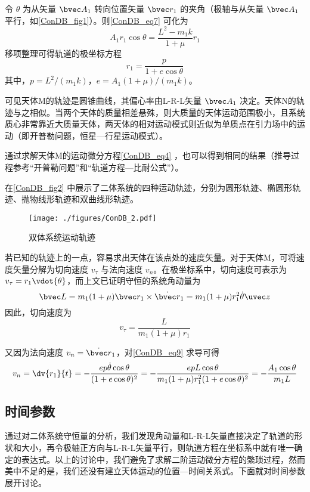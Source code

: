 令 $\theta$ 为从矢量 $\bvec A_1$ 转向位置矢量 $\bvec r_1$ 的夹角（极轴与从矢量 $\bvec A_1$ 平行，如\autoref{ConDB_fig1}）。则\autoref{ConDB_eq7} 可化为
\begin{equation}
A_1r_1\cos\theta = \frac{L^2-m_1k}{1+\mu}r_1
\end{equation}
移项整理可得轨道的极坐标方程
\begin{equation}\label{ConDB_eq9}
r_1=\frac{p}{1+e \cos\theta}
\end{equation}
其中，$p=L^2/(m_1k)$，$e=A_1(1+\mu)/(m_1k)$。

可见天体M的轨迹是圆锥曲线，其偏心率由L-R-L矢量 $\bvec A_1$ 决定。天体N的轨迹与之相似。当两个天体的质量相差悬殊，则大质量的天体运动范围极小，且系统质心非常靠近大质量天体，两天体的相对运动模式则近似为单质点在引力场中的运动（即开普勒问题，恒星—行星运动模式）。

通过求解天体M的运动微分方程\autoref{ConDB_eq4} ，也可以得到相同的结果（推导过程参考“开普勒问题”和“轨道方程—比耐公式”）。

在\autoref{ConDB_fig2} 中展示了二体系统的四种运动轨迹，分别为圆形轨迹、椭圆形轨迹、抛物线形轨迹和双曲线形轨迹。
\begin{figure}[ht]
\centering
\texttt{[image: ./figures/ConDB\_2.pdf]}
\caption{双体系统运动轨迹} \label{ConDB_fig2}
\end{figure}

若已知的轨迹上的一点，容易求出天体在该点处的速度矢量。对于天体M，可将速度矢量分解为切向速度 $v_\tau$ 与法向速度 $v_n$。在极坐标系中，切向速度可表示为 $v_\tau =r_1\vdot{\theta}$，而上文已证明守恒的系统角动量为
\begin{equation}\label{ConDB_eq10}
\bvec L  = m_1(1+\mu)\bvec r_1 \times \dot{\bvec r}_1= m_1(1+\mu)r_1^2\dot{\theta}\uvec z
\end{equation}
因此，切向速度为
\begin{equation}
v_\tau =\frac{L}{m_1(1+\mu)r_1}
\end{equation}

又因为法向速度 $v_n=\dot{\bvec r}_1$，对\autoref{ConDB_eq9} 求导可得
\begin{equation}
v_n =\dv{r_1}{t}=-\frac{ep\dot{\theta}\cos\theta}{(1+e\cos\theta)^2}=-\frac{epL\cos\theta}{m_1(1+\mu)r_1^2(1+e\cos\theta)^2}=-\frac{A_1\cos\theta}{m_1L}
\end{equation}

\subsection{时间参数}
通过对二体系统守恒量的分析，我们发现角动量和L-R-L矢量直接决定了轨道的形状和大小，再令极轴正方向与L-R-L矢量平行，则轨道方程在坐标系中就有唯一确定的表达式。以上的讨论中，我们避免了求解二阶运动微分方程的繁琐过程，然而美中不足的是，我们还没有建立天体运动的位置—时间关系式。下面就对时间参数展开讨论。

